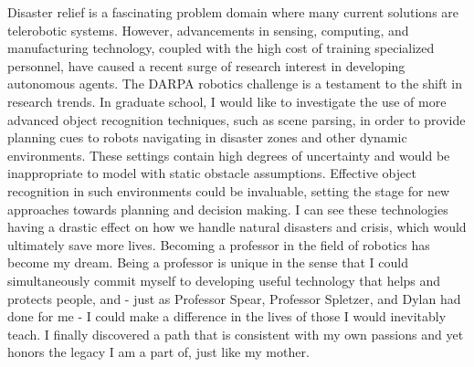 \documentclass[12pt]{article}
\begin{document}
Disaster relief is a fascinating problem domain where many current solutions
are telerobotic systems. However, advancements in sensing, computing, and
manufacturing technology, coupled with the high cost of training specialized
personnel, have caused a recent surge of research interest in developing
autonomous agents. The DARPA robotics challenge is a testament to the shift in
research trends. In graduate school, I would like to investigate the use of
more advanced object recognition techniques, such as scene parsing, in order to
provide planning cues to robots navigating in disaster zones and other dynamic
environments.  These settings contain high degrees of uncertainty and would be
inappropriate to model with static obstacle assumptions. Effective object
recognition in such environments could be invaluable, setting the stage for new
approaches towards planning and decision making. I can see these technologies
having a drastic effect on how we handle natural disasters and crisis, which
would ultimately save more lives. Becoming a professor in the field of robotics
has become my dream. Being a professor is unique in the sense that I could
simultaneously commit myself to developing useful technology that helps and
protects people, and - just as Professor Spear, Professor Spletzer, and Dylan
had done for me - I could make a difference in the lives of those I would
inevitably teach. I finally discovered a path that is consistent with my own
passions and yet honors the legacy I am a part of, just like my mother.
\end{document}
